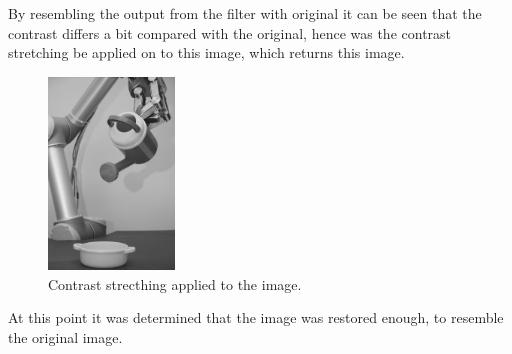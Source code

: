 By resembling the output from the filter with original it can be seen that the contrast differs a bit compared with the original,  hence was the contrast stretching be applied on to this image, which returns this image.\cite{dip}
 
 \begin{figure}[H]
 \centering
 \includegraphics[width=0.3\textwidth]{img4/filteredOutput_6509_contrast_strech.png}
 	\caption{Contrast strecthing applied to the image. }
    \label{fig:filter_become_ideal}
\end{figure} 
At this point it was determined that the image was restored enough, to resemble the original image.

